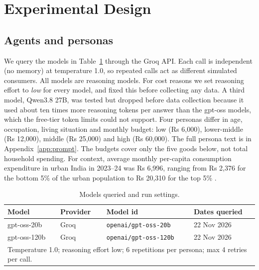 \documentclass[11pt,a4paper]{article}
\begin{document}
\section{Experimental Design}
\subsection{Agents and personas}
We query the \NModels{} models in Table~\ref{tab:models} through the Groq API. Each call is independent (no memory) at temperature 1.0, so repeated calls act as different simulated consumers. All models are reasoning models. For cost reasons we set reasoning effort to \emph{low} for every model, and fixed this before collecting any data. A third model, Qwen3.8 27B, was tested but dropped before data collection because it used about ten times more reasoning tokens per answer than the gpt-oss models, which the free-tier token limits could not support. Four personas differ in age, occupation, living situation and monthly budget: low (Rs 6{,}000), lower-middle (Rs 12{,}000), middle (Rs 25{,}000) and high (Rs 60{,}000). The full persona text is in Appendix~\ref{app:prompt}. The budgets cover only the five goods below, not total household spending. For context, average monthly per-capita consumption expenditure in urban India in 2023--24 was Rs 6{,}996, ranging from Rs 2{,}376 for the bottom 5\% of the urban population to Rs 20{,}310 for the top 5\% \citep{mospi2024}.
\begin{table}[!htbp]\centering\small\caption{Models queried and run settings.}\label{tab:models}
\begin{tabular}{llll}\toprule Model & Provider & Model id & Dates queried\\\midrule
gpt-oss-20b & Groq & \texttt{openai/gpt-oss-20b} & 22 Nov 2026\\
gpt-oss-120b & Groq & \texttt{openai/gpt-oss-120b} & 22 Nov 2026\\\midrule
\multicolumn{4}{l}{Temperature 1.0; reasoning effort low; 6 repetitions per persona; max 4 retries per call.}\\\bottomrule\end{tabular}\end{table}
\end{document}
